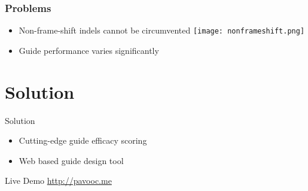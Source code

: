 \documentclass[Nike]{tuberlinbeamer}
\begin{document}
\begin{frame}
  \frametitle{Problems}
  \begin{itemize}
    \item Non-frame-shift indels cannot be circumvented
      \texttt{[image: nonframeshift.png]}
      \vspace{0.1cm}
    \pause
    \item Guide performance varies significantly
  \end{itemize}
\end{frame}

\section{Solution}


\begin{frame}{Solution}
  \begin{itemize}
    \vspace{0.2cm}
    \item Cutting-edge guide efficacy scoring
      \pause
    \vspace{0.2cm}
    \item Web based guide design tool
  \end{itemize}
\end{frame}

\begin{frame}{Live Demo}
  \url{http://pavooc.me}
\end{frame}
\end{document}
